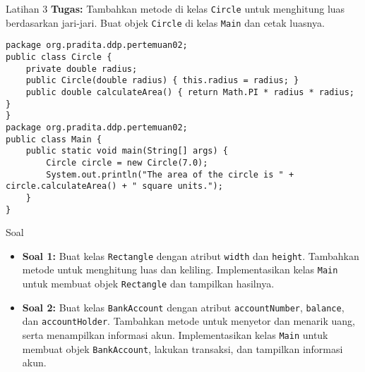 \documentclass[aspectratio=169, table]{beamer}
\begin{document}
\begin{frame}[fragile]{Latihan 3}
\vspace{15pt}
\textbf{Tugas:} Tambahkan metode di kelas \texttt{Circle} untuk menghitung luas berdasarkan jari-jari. Buat objek \texttt{Circle} di kelas \texttt{Main} dan cetak luasnya.
\begin{lstlisting}[style=JavaStyle]
package org.pradita.ddp.pertemuan02;
public class Circle {
	private double radius;
	public Circle(double radius) { this.radius = radius; }
	public double calculateArea() { return Math.PI * radius * radius; }
}
package org.pradita.ddp.pertemuan02;
public class Main {
	public static void main(String[] args) {
		Circle circle = new Circle(7.0);
		System.out.println("The area of the circle is " + circle.calculateArea() + " square units.");
	}
}
\end{lstlisting}
\end{frame}

\begin{frame}{Soal}
	\begin{itemize}
		\item \textbf{Soal 1:} Buat kelas \texttt{Rectangle} dengan atribut \texttt{width} dan \texttt{height}. Tambahkan metode untuk menghitung luas dan keliling. Implementasikan kelas \texttt{Main} untuk membuat objek \texttt{Rectangle} dan tampilkan hasilnya.
		\item \textbf{Soal 2:} Buat kelas \texttt{BankAccount} dengan atribut \texttt{accountNumber}, \texttt{balance}, dan \texttt{accountHolder}. Tambahkan metode untuk menyetor dan menarik uang, serta menampilkan informasi akun. Implementasikan kelas \texttt{Main} untuk membuat objek \texttt{BankAccount}, lakukan transaksi, dan tampilkan informasi akun.
	\end{itemize}

\end{frame}
\end{document}
